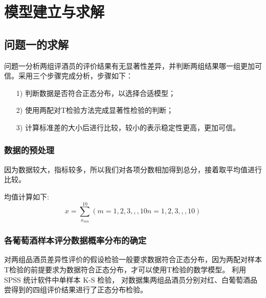 \documentclass[UTF8]{ctexart}
\begin{document}



\section{模型建立与求解}
\subsection{问题一的求解}
问题一分析两组评酒员的评价结果有无显著性差异，并判断两组结果哪一组更加可信。采用三个步骤完成分析，步骤如下：
\begin{itemize}
	\item [1)]{判断数据是否符合正态分布，以选择合适模型；}
	\item [2)]{使用两配对T检验方法完成显著性检验的判断；}
	\item [3)]{计算标准差的大小后进行比较，较小的表示稳定性更高，更加可信。}

\end{itemize}

\subsubsection{数据的预处理}
因为数据较大，指标较多，所以我们对各项分数相加得到总分，接着取平均值进行比较。

均值计算如下:
\begin{equation}
	x = \sum_{x_{mn}}^{10}(m = 1,2,3,,,10  n = 1,2,3,,,10)
\end{equation}

\subsubsection{各葡萄酒样本评分数据概率分布的确定}
对两组品酒员差异性评价的假设检验一般要求数据符合正态分布，因为两配对样本T检验的前提要求为数据符合正态分布，才可以使用T检验的数学模型。
利用 SPSS 统计软件中单样本 K-S 检验\cite{young1977proof}， 对数据集两组品酒员分别对红、白葡萄酒品尝得到的四组评价结果进行了正态分布检验。
\end{document}
